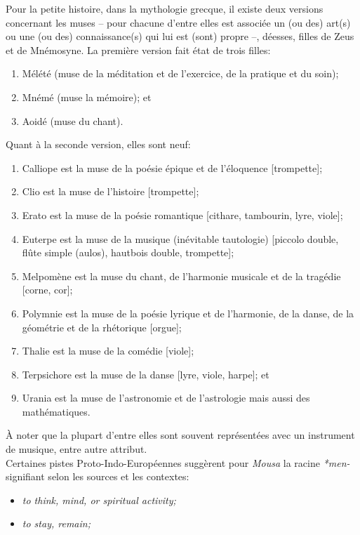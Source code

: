 \documentclass{article}
\begin{document}
{\indent Pour la petite histoire, dans la mythologie grecque, il existe deux versions concernant les muses -- pour chacune d'entre elles est associée un (ou des) art(s) ou une (ou des) connaissance(s) qui lui est (sont) propre --, déesses,  filles de Zeus et de Mnémosyne. La première version fait état de trois filles:
 \renewcommand{\labelenumi}{\arabic{enumi}.} \begin{enumerate}
\item Mélété (muse de la méditation et de l'exercice, de la pratique et du soin); 
\item Mnémé (muse la mémoire); et
\item Aoidé (muse du chant). 
\end{enumerate}
Quant à la seconde version, elles sont neuf:
 \begin{enumerate}
\item Calliope est la muse de la poésie épique et de l’éloquence [trompette];
\item Clio est la muse de l'histoire [trompette];
\item Erato est la muse de la poésie romantique %
[cithare, tambourin, lyre, viole];
\item Euterpe est la muse de la musique (inévitable tautologie) [piccolo double, flûte simple (aulos), hautbois double, trompette];
\item Melpomène est la muse du chant, de l’harmonie musicale et de la tragédie [corne, cor];
\item Polymnie est la muse de la poésie lyrique et de l’harmonie, de la danse, de la géométrie et de la rhétorique [orgue];
\item Thalie est la muse de la comédie [viole];
\item Terpsichore est la muse de la danse %
[lyre, viole, harpe]; et
\item Urania est la muse de l’astronomie et de l’astrologie mais aussi des mathématiques.
\end{enumerate}
À noter que la plupart d'entre elles sont souvent représentées avec un instrument de musique, entre autre attribut.\\ \indent Certaines pistes Proto-Indo-Européennes suggèrent pour \textit{Mousa} la racine \textit{*men-} signifiant selon les sources et les contextes:
\begin{itemize}
\item  \textsl{to think, mind, or spiritual activity;}
\item \textsl{to stay, remain;}

\end{itemize}}
\end{document}
